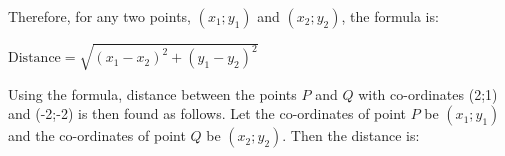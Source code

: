         
        \label{m39107*id67499}Therefore, for any two points, \begin{math}\left({x}_{1};{y}_{1}\right)\end{math} and \begin{math}\left({x}_{2};{y}_{2}\right)\end{math}, the formula is:\par 
        \label{m39107*id67561}\begin{math}\mathrm{Distance}=\sqrt{{\left({x}_{1}-{x}_{2}\right)}^{2}+{\left({y}_{1}-{y}_{2}\right)}^{2}}\end{math}\par 
        \label{m39107*id67630}Using the formula, distance between the points \begin{math}P\end{math} and \begin{math}Q\end{math} with co-ordinates (2;1) and (-2;-2) is then found as follows. Let the co-ordinates of point \begin{math}P\end{math} be \begin{math}\left({x}_{1};{y}_{1}\right)\end{math} and the co-ordinates of point \begin{math}Q\end{math} be \begin{math}\left({x}_{2};{y}_{2}\right)\end{math}. Then the distance is:\par 
        \label{m39107*id67728}\nopagebreak\noindent{}
